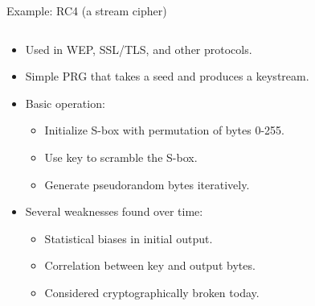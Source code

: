 \documentclass[aspectratio=169, lualatex, handout]{beamer}
\begin{document}
\begin{frame}{Example: RC4 (a stream cipher)}
	\begin{columns}[c]
		\begin{column}{0.6\textwidth}
			\begin{itemize}
				\item Used in WEP, SSL/TLS, and other protocols.
				\item Simple PRG that takes a seed and produces a keystream.
				\item Basic operation:
				      \begin{itemize}
					      \item Initialize S-box with permutation of bytes 0-255.
					      \item Use key to scramble the S-box.
					      \item Generate pseudorandom bytes iteratively.
				      \end{itemize}
				\item Several weaknesses found over time:
				      \begin{itemize}
					      \item Statistical biases in initial output.
					      \item Correlation between key and output bytes.
					      \item Considered cryptographically broken today.
				      \end{itemize}
			\end{itemize}
		\end{column}
		\begin{column}{0.4\textwidth}
			\vspace{1em}
		\end{column}
	\end{columns}
\end{frame}
\end{document}
